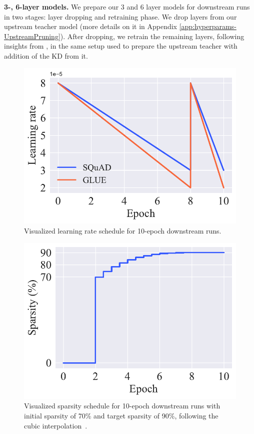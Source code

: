 \documentclass[11pt]{article}
\begin{document}
\noindent\textbf{3-, 6-layer models.} We prepare our 3 and 6 layer models for downstream runs in two stages: layer dropping and retraining phase. We drop layers from our upstream teacher model (more details on it in Appendix \ref{app:hyperparams-UpstreamPruning}). After dropping, we retrain the remaining layers, following insights from \cite{Turc2019WellReadSL}, in the same setup used to prepare the upstream teacher with addition of the KD from it.

\begin{figure}[htb!]
    \centering
    \includegraphics[scale=0.5]{media/LR_10ep.pdf}
    \caption{Visualized learning rate schedule for 10-epoch downstream runs.}
    \label{fig:lr_10ep}
\end{figure}

\begin{figure}[htb!]
    \centering
    \includegraphics[scale=0.5]{media/sparsity90_10ep.pdf}
    \caption{Visualized sparsity schedule for 10-epoch downstream runs with initial sparsity of 70\% and target sparsity of 90\%, following the cubic interpolation~\cite{Zhu2018ToPO}.}
    \label{fig:spars90_ep10}
\end{figure}
\end{document}
